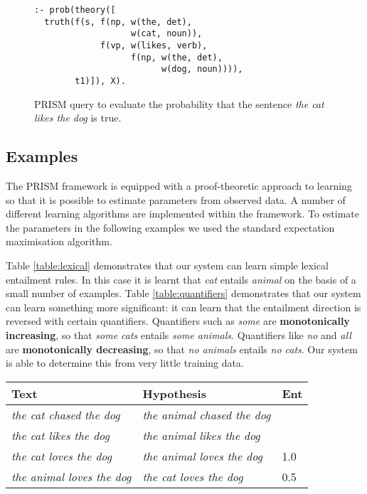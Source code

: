 \documentclass{svmult}
\begin{document}
\begin{figure}
\begin{lstlisting}
:- prob(theory([
  truth(f(s, f(np, w(the, det),
                   w(cat, noun)),
             f(vp, w(likes, verb),
                   f(np, w(the, det),
                         w(dog, noun)))),
        t1)]), X).
\end{lstlisting}
\caption{PRISM query to evaluate the probability that the sentence
  \emph{the cat likes the dog} is true.}
\label{figure:query}
\end{figure}

\subsection{Examples}


The PRISM framework is equipped with a proof-theoretic approach to learning so that it is possible to estimate parameters from observed data. A number of different learning algorithms are implemented within the framework. To estimate the
parameters in the following examples we used the standard expectation maximisation algorithm.

Table \ref{table:lexical} demonstrates that our system can learn
simple lexical entailment rules. In this case it is learnt that \emph{cat} entails
\emph{animal} on the basis of a small number of examples. Table \ref{table:quantifiers} demonstrates that our system can learn
something more significant: it can learn that the entailment direction
is reversed with certain quantifiers. Quantifiers such as \emph{some} are
\textbf{monotonically increasing}, so that \emph{some cats} entails
\emph{some animals}. Quantifiers like \emph{no} and \emph{all} are
\textbf{monotonically decreasing}, so that \emph{no animals} entails
\emph{no cats}. Our system is able to determine this from very little
training data.

\begin{table*}
\centering
\begin{tabular}{|l|l|l|}
\hline
Text & Hypothesis & Ent\\
\hline
\emph{the cat chased the dog} & \emph{the animal chased the dog} & \\
\emph{the cat likes the dog} & \emph{the animal likes the dog} & \\
\hline
\emph{the cat loves the dog} & \emph{the animal loves the dog} & 1.0\\
\emph{the animal loves the dog} & \emph{the cat loves the dog} & 0.5\\
\hline
\end{tabular}
\caption{Learning lexical entailment from examples, showing training
  data at the top, and test data below, with the degree of entailment
  determined by our system.}
\label{table:lexical}
\end{table*}
\end{document}
